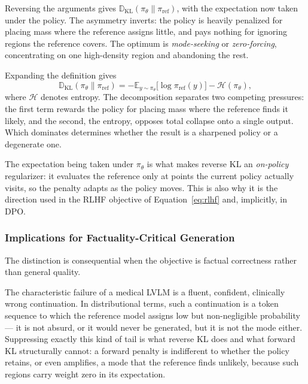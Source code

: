 Reversing the arguments gives $\mathbb{D}_{\text{KL}}(\pi_\theta \parallel \pi_{\text{ref}})$, with the expectation now taken under the policy. The asymmetry inverts: the policy is heavily penalized for placing mass where the reference assigns little, and pays nothing for ignoring regions the reference covers. The optimum is \emph{mode-seeking} or \emph{zero-forcing}, concentrating on one high-density region and abandoning the rest.

Expanding the definition gives
\begin{equation}\label{eq:rkl-decomp}
\mathbb{D}_{\text{KL}}(\pi_\theta \parallel \pi_{\text{ref}}) = -\mathbb{E}_{y \sim \pi_\theta}\big[\log \pi_{\text{ref}}(y)\big] - \mathcal{H}(\pi_\theta),
\end{equation}
where $\mathcal{H}$ denotes entropy. The decomposition separates two competing pressures: the first term rewards the policy for placing mass where the reference finds it likely, and the second, the entropy, opposes total collapse onto a single output. Which dominates determines whether the result is a sharpened policy or a degenerate one.

The expectation being taken under $\pi_\theta$ is what makes reverse KL an \emph{on-policy} regularizer: it evaluates the reference only at points the current policy actually visits, so the penalty adapts as the policy moves. This is also why it is the direction used in the RLHF objective of Equation~\ref{eq:rlhf} and, implicitly, in DPO.

\subsubsection{Implications for Factuality-Critical Generation}

The distinction is consequential when the objective is factual correctness rather than general quality.

The characteristic failure of a medical LVLM is a fluent, confident, clinically wrong continuation. In distributional terms, such a continuation is a token sequence to which the reference model assigns low but non-negligible probability --- it is not absurd, or it would never be generated, but it is not the mode either. Suppressing exactly this kind of tail is what reverse KL does and what forward KL structurally cannot: a forward penalty is indifferent to whether the policy retains, or even amplifies, a mode that the reference finds unlikely, because such regions carry weight zero in its expectation.

